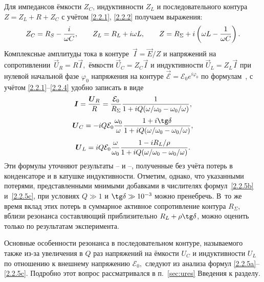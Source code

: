 Для импедансов ёмкости $Z_C$, индуктивности $Z_L$ и последовательного контура
$Z=Z_L+R+Z_C$ с учётом \eqref{2.2.1}, \eqref{2.2.2} получаем выражения:
\begin{equation}\eqmark{2.2.4}
Z_C=R_S-\dfrac{i}{\omega C}, \qquad Z_L=R_L+i\omega L,\qquad
Z=R_{\Sigma}+i\left(\omega L-\dfrac{1}{\omega C}\right).
\end{equation}
Комплексные амплитуды тока в контуре~$\vec I=\vec E/Z$ и напряжений
на сопротивлении~$\vec{U}_{\! R}=R\vec I,$ ёмкости $\vec{U}_{\! C}=Z_C\vec I$ и
индуктивности $\vec{U}_{\! L}=Z_L\vec I$ при нулевой начальной фазе $\varphi_0$
напряжения на контуре $\vec{\mathcal{E}}=\mathcal{E}_0e^{i\varphi_0}$ 
по формулам~,  
с учётом \eqref{2.2.1}--\eqref{2.2.4} удобно записать в виде
		\begin{equation}
			\eqmark{2.2.5a}
			\vec I=\dfrac{\vec
U_R}{R}=\dfrac{\mathcal{E}_0}{R_{\Sigma}}\dfrac{1}{
1+iQ(\omega/\omega_0-\omega_0/\omega)}, \end{equation}
		\begin{equation}
			\eqmark{2.2.5b}
			\vec
U_C=-iQ\mathcal{E}_0\dfrac{\omega_0}{\omega}\dfrac{1+i\tg\delta}{
1+iQ(\omega/\omega_0-\omega_0/\omega)},
		\end{equation}
		\begin{equation}
			\eqmark{2.2.5c}
			\vec
U_L=iQ\mathcal{E}_0\dfrac{\omega}{\omega_0}\dfrac{1-iR_L/\rho}{
1+iQ(\omega/\omega_0-\omega_0/\omega)}.
		\end{equation}
Эти формулы уточняют результаты -- и 
--,
полученные без учёта потерь в конденсаторе и в катушке индуктивности. Отметим,
однако, что указанными потерями, представленными мнимыми добавками в числителях
формул~\eqref{2.2.5b} и~\eqref{2.2.5c}, при условиях $Q\gg1$ и
$\tg \delta \gg 10^{-3}$ можно пренебречь. В~то же время вклад этих потерь в
суммарное активное сопротивление контура $R_{\Sigma}$, вблизи
резонанса составляющий приблизительно $R_L+\rho\tg\delta$, 
можно оценить только по результатам эксперимента.

Основные особенности резонанса в последовательном контуре, называемого также
 из-за увеличения в $Q$ раз напряжений на
ёмкости $U_C$ и индуктивности $U_L$ по отношению к внешнему напряжению
$\mathcal{E}_0,$ следуют из анализа формул \eqref{2.2.5a}--\eqref{2.2.5c}. 
Подробно этот вопрос рассматривался в п.~\ref{sec:ures} Введения к разделу.

